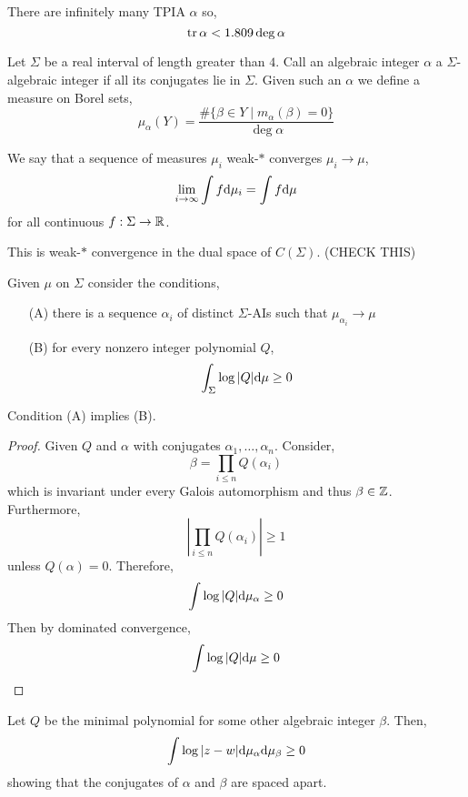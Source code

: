 \documentclass[12pt]{article}
\begin{document}
\begin{thm}[Smith]
There are infinitely many TPIA $\alpha$ so,
\[ \operatorname{\mathrm{tr}}{\alpha} < 1.809 \deg{\alpha} \]
\end{thm}

\begin{defn}
Let $\Sigma$ be a real interval of length greater than $4$. Call an algebraic integer $\alpha$ a $\Sigma$-algebraic integer if all its conjugates lie in $\Sigma$. Given such an $\alpha$ we define a measure on Borel sets,
\[ \mu_\alpha(Y) = \frac{\# \{ \beta \in Y \mid m_\alpha(\beta) = 0 \}}{\deg{\alpha}} \] 
\end{defn}

\begin{defn}
We say that a sequence of measures $\mu_i$ weak-$*$ converges $\mu_i \to \mu$,
\[ \lim_{i \to \infty} \int f \mathrm{d}{\mu_i} = \int f \mathrm{d}{\mu} \]
for all continuous $f : \Sigma \to \mathbb{R}$.
\end{defn}

\begin{rmk}
This is weak-$*$ convergence in the dual space of $C(\Sigma)$. (CHECK THIS)
\end{rmk}

\begin{defn}
Given $\mu$ on $\Sigma$ consider the conditions,
\begin{enumerate}
\item[(A)] there is a sequence $\alpha_i$ of distinct $\Sigma$-AIs such that $\mu_{\alpha_i} \to \mu$
\item[(B)] for every nonzero integer polynomial $Q$,
\[ \int_{\Sigma} \log{|Q|} \mathrm{d}{\mu} \ge 0 \]
\end{enumerate}
\end{defn}

\begin{prop}
Condition (A) implies (B).
\end{prop}

\begin{proof}
Given $Q$ and $\alpha$ with conjugates $\alpha_1, \dots, \alpha_n$. Consider,
\[ \beta = \prod_{i \le n} Q(\alpha_i) \]
which is invariant under every Galois automorphism and thus $\beta \in \mathbb{Z}$. Furthermore,
\[ \left| \prod_{i \le n} Q(\alpha_i) \right| \ge 1 \]
unless $Q(\alpha) = 0$. Therefore,
\[ \int \log{|Q|} \mathrm{d}{\mu_\alpha} \ge 0 \]
Then by dominated convergence,
\[ \int \log{|Q|} \mathrm{d}{\mu} \ge 0 \]
\end{proof}

\begin{example}
Let $Q$ be the minimal polynomial for some other algebraic integer $\beta$. Then,
\[ \int \log{|z - w|} \mathrm{d}{\mu_\alpha} \mathrm{d}{\mu_\beta} \ge 0 \]
showing that the conjugates of $\alpha$ and $\beta$ are spaced apart.
\end{example}
\end{document}
